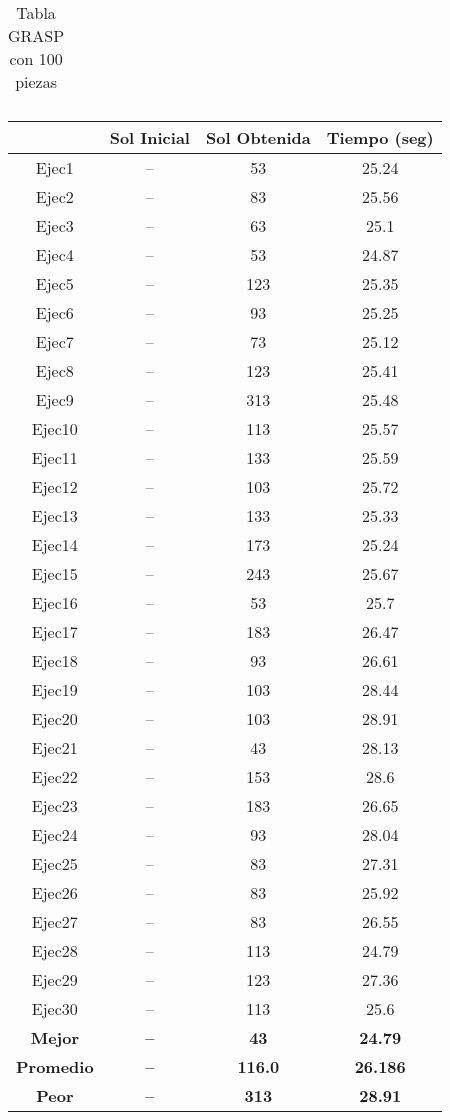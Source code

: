 \begin{center}
\begin{table}
\begin{tabular}{|c|c|c|c|}
\end{tabular}
\caption{Tabla GRASP con 100 piezas}
\end{table}

\begin{table}

\begin{tabular}{|c|c|c|c|}


\hline
 & {\bf Sol Inicial} & {\bf Sol Obtenida} & {\bf Tiempo (seg)} \\
\hline
Ejec1 & -- & 53  & 25.24 \\
\hline
Ejec2 & -- & 83  & 25.56 \\
\hline
Ejec3 & -- & 63  & 25.1 \\
\hline
Ejec4 & -- & 53  & 24.87 \\
\hline
Ejec5 & -- & 123  & 25.35 \\
\hline
Ejec6 & -- & 93  & 25.25 \\
\hline
Ejec7 & -- & 73  & 25.12 \\
\hline
Ejec8 & -- & 123  & 25.41 \\
\hline
Ejec9 & -- & 313  & 25.48 \\
\hline
Ejec10 & -- & 113  & 25.57 \\
\hline
Ejec11 & -- & 133  & 25.59 \\
\hline
Ejec12 & -- & 103  & 25.72 \\
\hline
Ejec13 & -- & 133  & 25.33 \\
\hline
Ejec14 & -- & 173  & 25.24 \\
\hline
Ejec15 & -- & 243  & 25.67 \\
\hline
Ejec16 & -- & 53  & 25.7 \\
\hline
Ejec17 & -- & 183  & 26.47 \\
\hline
Ejec18 & -- & 93  & 26.61 \\
\hline
Ejec19 & -- & 103  & 28.44 \\
\hline
Ejec20 & -- & 103  & 28.91 \\
\hline
Ejec21 & -- & 43  & 28.13 \\
\hline
Ejec22 & -- & 153  & 28.6 \\
\hline
Ejec23 & -- & 183  & 26.65 \\
\hline
Ejec24 & -- & 93  & 28.04 \\
\hline
Ejec25 & -- & 83  & 27.31 \\
\hline
Ejec26 & -- & 83  & 25.92 \\
\hline
Ejec27 & -- & 83  & 26.55 \\
\hline
Ejec28 & -- & 113  & 24.79 \\
\hline
Ejec29 & -- & 123  & 27.36 \\
\hline
Ejec30 & -- & 113  & 25.6 \\
\hline
{\bf Mejor} & {\bf -- } & {\bf 43} & {\bf 24.79} \\
\hline
{\bf Promedio} & {\bf -- } & {\bf 116.0} & {\bf 26.186} \\
\hline
{\bf Peor} & {\bf -- } & {\bf 313} & {\bf 28.91} \\
\hline



\end{tabular}
\end{table}
\end{center}
